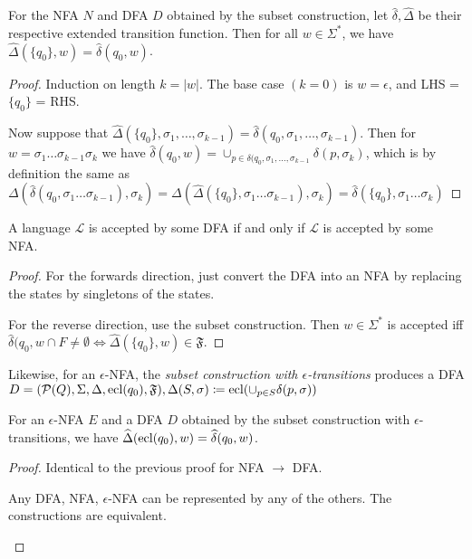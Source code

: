 \documentclass[10pt,a4paper]{article}
\begin{document}
\begin{theorem}
For the NFA $N$ and DFA $D$ obtained by the subset construction, let $\hat{\delta}, \hat{\Delta}$ be their respective extended transition function. Then for all $w \in \Sigma^{\ast}$, we have $\hat{\Delta}(\{q_0\}, w) = \hat{\delta}(q_0, w)$.
\end{theorem}
\begin{proof}
Induction on length $k = |w|$. The base case $(k=0)$ is $w = \epsilon$, and LHS = $\{q_0\}$ = RHS.

Now suppose that $\hat{\Delta}(\{q_0\}, \sigma_1, \ldots, \sigma_{k-1}) = \hat{\delta}(q_0, \sigma_1, \ldots, \sigma_{k-1})$. Then for $w = \sigma_1\ldots \sigma_{k-1}\sigma_k$ we have $\hat{\delta}(q_0,w) = \cup_{p\in \delta(q_0, \sigma_1, \ldots, \sigma_{k-1}} \delta(p,\sigma_k)$, which is by definition the same as $\Delta(\hat{\delta}(q_0, \sigma_1\ldots\sigma_{k-1}),\sigma_k) = \Delta(\hat{\Delta}(\{q_0\},\sigma_1\ldots\sigma_{k-1}),\sigma_k) = \hat{\delta}(\{q_0\}, \sigma_1\ldots\sigma_k)$
\end{proof}

\begin{corollary}
A language $\mathcal{L}$ is accepted by some DFA if and only if $\mathcal{L}$ is accepted by some NFA.
\end{corollary}
\begin{proof}
For the forwards direction, just convert the DFA into an NFA by replacing the states by singletons of the states.

For the reverse direction, use the subset construction. Then $w \in \Sigma^{\ast}$ is accepted iff $\hat{\delta}(q_0, w \cap F \neq \emptyset \iff \hat{\Delta}(\{q_0\},w) \in \mathfrak{F}$.
\end{proof}

Likewise, for an $\epsilon$-NFA, the \emph{subset construction with $\epsilon$-transitions} produces a DFA $D = (\mathcal{P}(Q), \Sigma, \Delta, \operatorname{ecl}(q_0), \mathfrak{F}), \Delta(S, \sigma) \coloneqq \operatorname{ecl}(\cup_{p\in S} \delta(p, \sigma))$

\begin{theorem}
For an $\epsilon$-NFA $E$ and a DFA $D$ obtained by the subset construction with $\epsilon$-transitions, we have $\widehat{\Delta}(\operatorname{ecl}(q_0),w) = \widehat{\delta}(q_0,w)$.
\end{theorem}
\begin{proof}
Identical to the previous proof for NFA $\to$ DFA.

\begin{corollary}
Any DFA, NFA, $\epsilon$-NFA can be represented by any of the others. The constructions are equivalent.
\end{corollary}
\end{proof}
\end{document}
